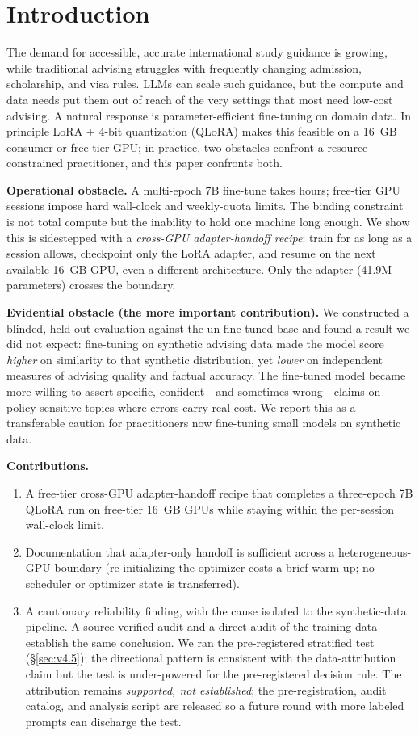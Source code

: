 \documentclass[11pt]{article}
\begin{document}
\section{Introduction}
The demand for accessible, accurate international study guidance is growing, while traditional advising struggles with frequently changing admission, scholarship, and visa rules. LLMs can scale such guidance, but the compute and data needs put them out of reach of the very settings that most need low-cost advising. A natural response is parameter-efficient fine-tuning on domain data. In principle LoRA + 4-bit quantization (QLoRA) makes this feasible on a 16~GB consumer or free-tier GPU; in practice, two obstacles confront a resource-constrained practitioner, and this paper confronts both.

\textbf{Operational obstacle.} A multi-epoch 7B fine-tune takes hours; free-tier GPU sessions impose hard wall-clock and weekly-quota limits. The binding constraint is not total compute but the inability to hold one machine long enough. We show this is sidestepped with a \emph{cross-GPU adapter-handoff recipe}: train for as long as a session allows, checkpoint only the LoRA adapter, and resume on the next available 16~GB GPU, even a different architecture. Only the adapter (41.9M parameters) crosses the boundary.

\textbf{Evidential obstacle (the more important contribution).} We constructed a blinded, held-out evaluation against the un-fine-tuned base and found a result we did not expect: fine-tuning on synthetic advising data made the model score \emph{higher} on similarity to that synthetic distribution, yet \emph{lower} on independent measures of advising quality and factual accuracy. The fine-tuned model became more willing to assert specific, confident---and sometimes wrong---claims on policy-sensitive topics where errors carry real cost. We report this as a transferable caution for practitioners now fine-tuning small models on synthetic data.

\textbf{Contributions.}
\begin{enumerate}\itemsep0pt
\item A free-tier cross-GPU adapter-handoff recipe that completes a three-epoch 7B QLoRA run on free-tier 16~GB GPUs while staying within the per-session wall-clock limit.
\item Documentation that adapter-only handoff is sufficient across a heterogeneous-GPU boundary (re-initializing the optimizer costs a brief warm-up; no scheduler or optimizer state is transferred).
\item A cautionary reliability finding, with the cause isolated to the synthetic-data pipeline. A source-verified audit and a direct audit of the training data establish the same conclusion. We ran the pre-registered stratified test (\S\ref{sec:v4.5}); the directional pattern is consistent with the data-attribution claim but the test is under-powered for the pre-registered decision rule. The attribution remains \emph{supported, not established}; the pre-registration, audit catalog, and analysis script are released so a future round with more labeled prompts can discharge the test.
\end{enumerate}
\end{document}

